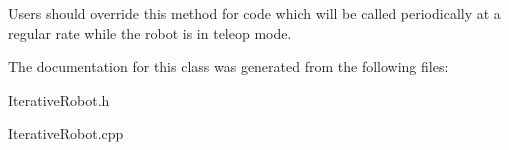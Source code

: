 Users should override this method for code which will be called periodically at a regular rate while the robot is in teleop mode. 

The documentation for this class was generated from the following files:\begin{DoxyCompactItemize}
\item 
IterativeRobot.h\item 
IterativeRobot.cpp\end{DoxyCompactItemize}
